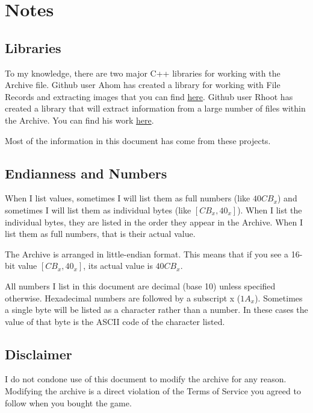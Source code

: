 \section*{Notes}
\label{sec:notes}

\subsection*{Libraries}
\label{subsec:libs}

To my knowledge, there are two major C++ libraries for working with the Archive
file.  Github user Ahom has created a library for working with File Records and
extracting images that you can find 
\href{https://github.com/ahom/gw2DatTools/}{here}.  Github user Rhoot has
created a library that will extract information from a large number of files
within the Archive.  You can find his work
\href{https://github.com/rhoot/gw2formats}{here}.

Most of the information in this document has come from these projects.

\subsection*{Endianness and Numbers}
\label{subsec:endiannum}

When I list values, sometimes I will list them as full numbers (like $40CB_x$)
and sometimes I will list them as individual bytes (like $[CB_x,40_x]$).  When
I list the individual bytes, they are listed in the order they appear in the
Archive.  When I list them as full numbers, that is their actual value.

The Archive is arranged in little-endian format.  This means that if you see a
16-bit value $[CB_x,40_x]$, its actual value is $40CB_x$.

All numbers I list in this document are decimal (base 10) unless specified
otherwise.  Hexadecimal numbers are followed by a subscript x ($1A_x$).
Sometimes a single byte will be listed as a character rather than a number.  In
these cases the value of that byte is the ASCII code of the character listed.

\subsection*{Disclaimer}
\label{subsec:disclaimer}

I do not condone use of this document to modify the archive for any reason.
Modifying the archive is a direct violation of the Terms of Service you agreed
to follow when you bought the game.


